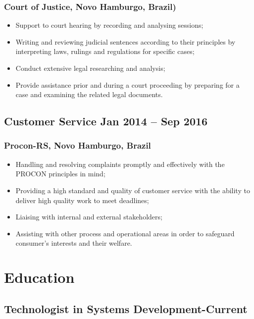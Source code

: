 \documentclass[11pt]{article}
\begin{document}
\subsubsection{Court of Justice, Novo Hamburgo, Brazil)}
\begin{itemize}
    \item[\checkmark] Support to court hearing by recording and analysing sessions; 
    \item[\checkmark]  Writing and reviewing judicial sentences according to their principles by interpreting laws, rulings and regulations for specific cases;
    \item[\checkmark] Conduct extensive legal researching and analysis;
    \item[\checkmark] Provide assistance prior and during a court proceeding by preparing for a case and examining the related legal documents.
\end{itemize}

\subsection{Customer Service \hfill \normalfont Jan 2014 -- Sep 2016}
\subsubsection{Procon-RS, Novo Hamburgo, Brazil}
\begin{itemize}
    \item[\checkmark] Handling and resolving complaints promptly and effectively with the PROCON principles in mind; 
    \item[\checkmark] Providing a high standard and quality of customer service with the ability to deliver high quality work to meet deadlines;
    \item[\checkmark] Liaising with internal and external stakeholders;
    \item[\checkmark] Assisting with other process and operational areas in order to safeguard consumer’s interests and their welfare.
\end{itemize}
\section{Education}
\subsection{Technologist in Systems Development\hfill {}-Current}  
\end{document}
